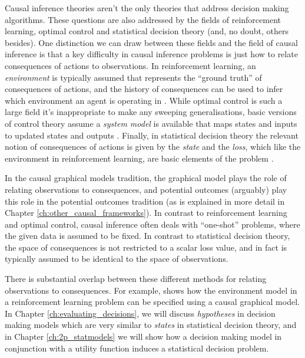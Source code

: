Causal inference theories aren't the only theories that address decision making algorithms. These questions are also addressed by the fields of reinforcement learning, optimal control and statistical decision theory (and, no doubt, others besides). One distinction we can draw between these fields and the field of causal inference is that a key difficulty in causal inference problems is just how to relate consequences of actions to observations. In reinforcement learning, an \emph{environment} is typically assumed that represents the ``ground truth'' of consequences of actions, and the history of consequences can be used to infer which environment an agent is operating in \citep{barto_reinforcement_1998}. While optimal control is such a large field it's inappropriate to make any sweeping generalisations, basic versions of control theory assume a \emph{system model} is available that maps states and inputs to updated states and outputs \citep{ogata_discrete-time_1995}. Finally, in statistical decision theory the relevant notion of consequences of actions is given by the \emph{state} and the \emph{loss}, which like the environment in reinforcement learning, are basic elements of the problem \citep{wald_statistical_1950}.

In the causal graphical models tradition, the graphical model plays the role of relating observations to consequences, and potential outcomes (arguably) play this role in the potential outcomes tradition (as is explained in more detail in Chapter \ref{ch:other_causal_frameworks}). In contrast to reinforcement learning and optimal control, causal inference often deals with ``one-shot'' problems, where the given data is assumed to be fixed. In contrast to statistical decision theory, the space of consequences is not restricted to a scalar loss value, and in fact is typically assumed to be identical to the space of observations.

There is substantial overlap between these different methods for relating observations to consequences. For example, \citet[Chap.~4]{lattimore_learning_2017} shows how the environment model in a reinforcement learning problem can be specified using a causal graphical model. In Chapter \ref{ch:evaluating_decisions}, we will discuss \emph{hypotheses} in decision making models which are very similar to \emph{states} in statistical decision theory, and in Chapter \ref{ch:2p_statmodels} we will show how a decision making model in conjunction with a utility function induces a statistical decision problem.



